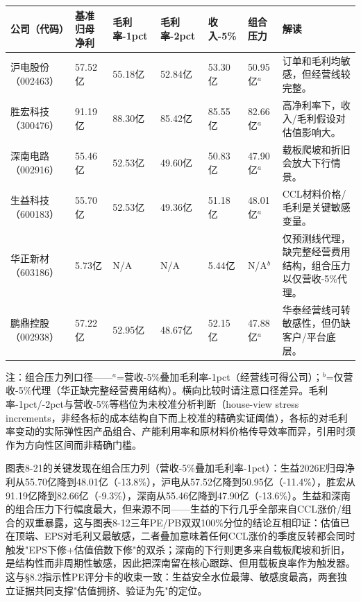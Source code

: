 \begin{exhibitbox}[图表8-21：2026E年度EPS敏感性矩阵]
\footnotesize
\begin{tabularx}{\textwidth}{L{1.8cm}R{1.7cm}R{1.8cm}R{1.8cm}R{1.8cm}R{1.8cm}X}
\toprule
\textbf{公司（代码）} & \textbf{基准归母净利} & \textbf{毛利率-1pct} & \textbf{毛利率-2pct} & \textbf{收入-5\%} & \textbf{组合压力} & \textbf{解读} \\
\midrule
沪电股份（002463） & 57.52亿 & 55.18亿 & 52.84亿 & 53.30亿 & 50.95亿$^{a}$ & 订单和毛利均敏感，但经营线较完整。 \\
胜宏科技（300476） & 91.19亿 & 88.30亿 & 85.42亿 & 85.55亿 & 82.66亿$^{a}$ & 高净利率下，收入/毛利假设对估值影响大。 \\
深南电路（002916） & 55.46亿 & 52.53亿 & 49.60亿 & 50.83亿 & 47.90亿$^{a}$ & 载板爬坡和折旧会放大下行情景。 \\
生益科技（600183） & 55.70亿 & 52.53亿 & 49.36亿 & 51.18亿 & 48.01亿$^{a}$ & CCL材料价格/毛利是关键敏感变量。 \\
华正新材（603186） & 5.73亿 & N/A & N/A & 5.44亿 & N/A$^{b}$ & 仅预测线代理，缺完整经营费用结构，组合压力以仅营收-5\%代理。 \\
鹏鼎控股（002938） & 57.22亿 & 52.95亿 & 48.67亿 & 52.15亿 & 47.88亿$^{a}$ & 华泰经营线可转敏感性，但仍缺客户/平台底层。 \\
\bottomrule
\end{tabularx}
\vspace{0.3em}
\scriptsize 注：组合压力列口径——$^{a}$=营收-5\%叠加毛利率-1pct（经营线可得公司）；$^{b}$=仅营收-5\%代理（华正缺完整经营费用结构）。横向比较时请注意口径差异。毛利率-1pct/-2pct与营收-5\%等档位为未校准分析判断（house-view stress increments，非经各标的成本结构自下而上校准的精确实证阈值），各标的对毛利率变动的实际弹性因产品组合、产能利用率和原材料价格传导效率而异，引用时须作为方向性区间而非精确门槛。
\end{exhibitbox}

图表8-21的关键发现在组合压力列（营收-5\%叠加毛利率-1pct）：生益2026E归母净利从55.70亿降到48.01亿（-13.8\%），沪电从57.52亿降到50.95亿（-11.4\%），胜宏从91.19亿降到82.66亿（-9.3\%），深南从55.46亿降到47.90亿（-13.6\%）。生益和深南的组合压力下行幅度最大，但来源不同——生益的下行几乎全部来自CCL涨价/组合的双重暴露，这与图表8-12三年PE/PB双双100\%分位的结论互相印证：估值已在顶端、EPS对毛利又最敏感，二者叠加意味着任何CCL涨价的季度反转都会同时触发"EPS下修+估值倍数下修"的双杀；深南的下行则更多来自载板爬坡和折旧，是结构性而非周期性敏感，因此把深南留在核心跟踪、但用载板良率作为触发器。这与§8.2指示性PE评分卡的收束一致：生益安全水位最薄、敏感度最高，两套独立证据共同支撑"估值拥挤、验证为先"的定位。

